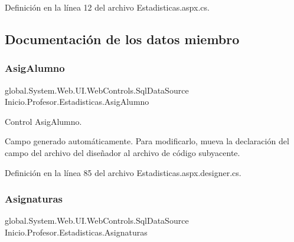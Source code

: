 Definición en la línea 12 del archivo Estadisticas.\+aspx.\+cs.


\begin{DoxyCode}{0}

\end{DoxyCode}


\subsection{Documentación de los datos miembro}
\mbox{\label{classInicio_1_1Profesor_1_1Estadisticas_aff6da716abe4311dc3fc374b4f45434a}} 
\subsubsection{\texorpdfstring{AsigAlumno}{AsigAlumno}}
{\footnotesize\ttfamily global.\+System.\+Web.\+U\+I.\+Web\+Controls.\+Sql\+Data\+Source Inicio.\+Profesor.\+Estadisticas.\+Asig\+Alumno\hspace{0.3cm}{\ttfamily [protected]}}



Control Asig\+Alumno. 

Campo generado automáticamente. Para modificarlo, mueva la declaración del campo del archivo del diseñador al archivo de código subyacente. 

Definición en la línea 85 del archivo Estadisticas.\+aspx.\+designer.\+cs.

\mbox{\label{classInicio_1_1Profesor_1_1Estadisticas_a3717d525923c5cc602bcbdbec65c9b04}} 
\subsubsection{\texorpdfstring{Asignaturas}{Asignaturas}}
{\footnotesize\ttfamily global.\+System.\+Web.\+U\+I.\+Web\+Controls.\+Sql\+Data\+Source Inicio.\+Profesor.\+Estadisticas.\+Asignaturas\hspace{0.3cm}{\ttfamily [protected]}}



